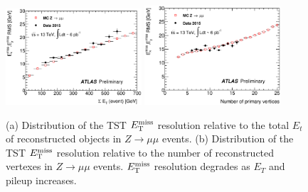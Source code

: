 \begin{figure}[htb]
  \begin{center}
    \includegraphics[width=0.45\textwidth]{figures/METCalib/METReso_Et.eps}\hspace{0.05\textwidth}
    \includegraphics[width=0.45\textwidth]{figures/METCalib/METReso_nVtx.eps}\hspace{0.05\textwidth}
\end{center}
\caption{(a) Distribution of the TST $E_{\mathrm{T}}^{\mathrm{miss}}$ resolution relative to the total $E_t$ of reconstructed objects in $Z\rightarrow \mu\mu$ events.  (b) Distribution of the TST $E_{\mathrm{T}}^{\mathrm{miss}}$ resolution relative to the number of reconstructed vertexes in $Z\rightarrow \mu\mu$ events.  $E_{\mathrm{T}}^{\mathrm{miss}}$ resolution degrades as $E_T$ and pileup increases.  }
\label{fig:jetCalibFlow} 
\end{figure}







